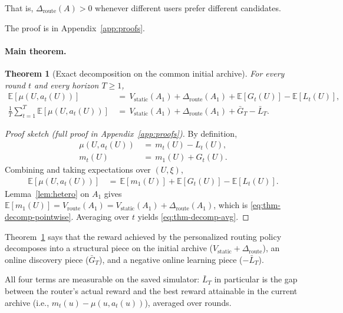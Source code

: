 \documentclass{article} %
\newtheorem{theorem}{Theorem}
\providecommand{\E}{\mathbb{E}}
\begin{document}
That is, $\Delta_{\mathrm{route}}(A) > 0$ whenever different users prefer different candidates.

The proof is in Appendix~\ref{app:proofs}.

\paragraph{Main theorem.}

\label{sec:method-thm-decomp}

\begin{theorem}[Exact decomposition on the common initial archive]
\label{thm:decomp}
For every round $t$ and every horizon $T \ge 1$,
\begin{align}
\E[\mu(U, a_t(U))]
&\,=\, V_{\mathrm{static}}(A_1) + \Delta_{\mathrm{route}}(A_1) + \E[G_t(U)] - \E[L_t(U)],
\label{eq:thm-decomp-pointwise}\\
\frac{1}{T}\sum_{t=1}^T \E[\mu(U, a_t(U))]
&\,=\, V_{\mathrm{static}}(A_1) + \Delta_{\mathrm{route}}(A_1) + \bar G_T - \bar L_T.
\label{eq:thm-decomp-avg}
\end{align}
\end{theorem}

\begin{proof}[Proof sketch (full proof in Appendix~\ref{app:proofs})]
By definition,
\begin{align*}
\mu(U, a_t(U)) &\,=\, m_t(U) - L_t(U), \\
m_t(U) &\,=\, m_1(U) + G_t(U).
\end{align*}
Combining and taking expectations over $(U,\xi)$,
\begin{align*}
\E[\mu(U, a_t(U))] &\,=\, \E[m_1(U)] + \E[G_t(U)] - \E[L_t(U)].
\end{align*}
Lemma~\ref{lem:hetero} on $A_1$ gives $\E[m_1(U)] = V_{\mathrm{route}}(A_1) = V_{\mathrm{static}}(A_1) + \Delta_{\mathrm{route}}(A_1)$, which is \eqref{eq:thm-decomp-pointwise}. Averaging over $t$ yields \eqref{eq:thm-decomp-avg}.
\end{proof}

Theorem~\ref{thm:decomp} says that the reward achieved by the personalized routing policy decomposes into a structural piece on the initial archive ($V_{\mathrm{static}}+\Delta_{\mathrm{route}}$), an online discovery piece ($\bar G_T$), and a negative online learning piece ($-\bar L_T$).

All four terms are measurable on the saved simulator: $\bar L_T$ in particular is the gap between the router's actual reward and the best reward attainable in the current archive (i.e., $m_t(u) - \mu(u, a_t(u))$), averaged over rounds.
\end{document}
